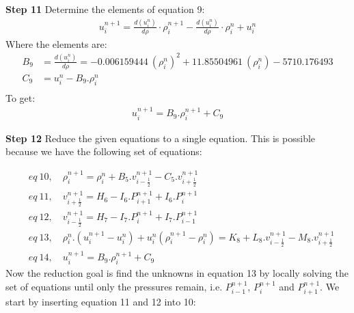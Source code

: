 \documentclass[11pt,letterpaper,titlepage]{article}
\newcommand{\half}{\frac{1}{2}}
\begin{document}
\newpage \noindent
\textbf{Step 11}\newline
Determine the elements of equation 9:
\begin{equation*}
\begin{aligned}
u_{i}^{n+1} = \frac{d(u_i^{n})}{d\rho}\cdot \rho_{i}^{n+1} -\frac{d(u_i^{n})}{d\rho}\cdot\rho_{i}^{n} +  u_{i}^{n}  
\end{aligned}
\end{equation*}
\newline
Where the elements are:
\begin{equation*}
\begin{aligned}
B_9&=\frac{d(u_i^{n})}{d\rho}=-0.006159444 \ (\rho_{i}^{n})^2+11.85504961 \ (\rho_{i}^{n}) -5710.176493\\
C_9&=u_i^n-B_9.\rho_i^n \\
\end{aligned}
\end{equation*}
\newline
To get:
\begin{equation}
\begin{aligned}
u_{i}^{n+1} = B_9.\rho_{i}^{n+1}+C_9
\end{aligned}
\end{equation}







\newpage \noindent
\textbf{Step 12}\newline
Reduce the given equations to a single equation. This is possible because we have the following set of equations:

\begin{equation*}
\begin{aligned}
&eq \ 10, \quad \rho_i^{n+1}=\rho_i^{n}+B_5.v_{i-\half}^{n+1} - C_5.v_{i+\half}^{n+1}\\
&eq \ 11, \quad v_{i+\half}^{n+1}=H_6-I_6.P_{i+1}^{n+1}+I_6.P_{i}^{n+1} \\
&eq \ 12, \quad v_{i-\half}^{n+1}=H_7-I_7.P_{i}^{n+1}+I_7.P_{i-1}^{n+1} \\
&eq \ 13, \quad \rho_i^{n}.(u_i^{n+1}-u_i^{n}) + u_i^{n}(\rho_i^{n+1}-\rho_i^{n})=K_8+L_8.v_{i-\half}^{n+1}-M_8.v_{i+\half}^{n+1} \\
&eq \ 14, \quad u_{i}^{n+1} = B_9.\rho_{i}^{n+1}+C_9
\end{aligned}
\end{equation*}
\newline
Now the reduction goal is find the unknowns in equation 13 by locally solving the set of equations until only the pressures remain, i.e. $P_{i-1}^{n+1}$, $P_{i}^{n+1}$ and $P_{i+1}^{n+1}$.
\newline
\newline
We start by inserting equation 11 and 12 into 10:
\end{document}
